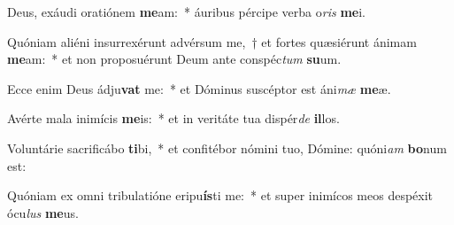 \item Deus, exáudi oratiónem \textbf{me}am:~* áuribus pércipe verba o\textit{ris} \textbf{me}i.
\item Quóniam aliéni insurrexérunt advérsum me,~† et fortes quæsiérunt ánimam \textbf{me}am:~* et non proposuérunt Deum ante conspéc\textit{tum} \textbf{su}um.
\item Ecce enim Deus ádju\textbf{vat} me:~* et Dóminus suscéptor est áni\textit{mæ} \textbf{me}æ.
\item Avérte mala inimícis \textbf{me}is:~* et in veritáte tua dispér\textit{de} \textbf{il}los.
\item Voluntárie sacrificábo \textbf{ti}bi,~* et confitébor nómini tuo, Dómine: quóni\textit{am} \textbf{bo}num est:
\item Quóniam ex omni tribulatióne eripu\textbf{ís}ti me:~* et super inimícos meos despéxit ócu\textit{lus} \textbf{me}us.
